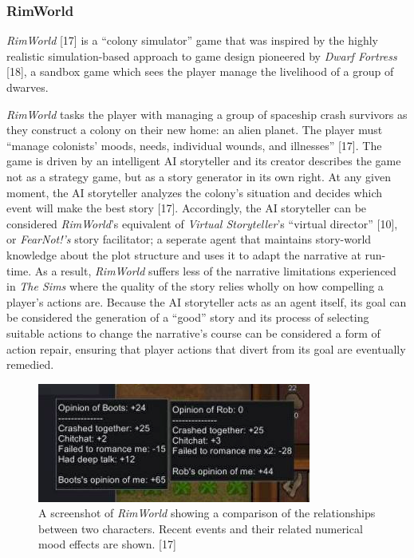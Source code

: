 \documentclass{sig-alternate-05-2015}
\begin{document}
\subsubsection{RimWorld}
\textit{RimWorld} [17] is a ``colony simulator'' game that was inspired by the highly realistic simulation-based approach to game design pioneered by \textit{Dwarf Fortress} [18], a sandbox game which sees the player manage the livelihood of a group of dwarves.

\textit{RimWorld} tasks the player with managing a group of spaceship crash survivors as they construct a colony on their new home: an alien planet. The player must ``manage colonists' moods, needs, individual wounds, and illnesses'' [17]. The game is driven by an intelligent AI storyteller and its creator describes the game not as a strategy game, but as a story generator in its own right. At any given moment, the AI storyteller analyzes the colony's situation and decides which event will make the best story [17]. Accordingly, the AI storyteller can be considered \textit{RimWorld}'s equivalent of \textit{Virtual Storyteller}'s ``virtual director'' [10], or \textit{FearNot!'s} story facilitator;  a seperate agent that maintains story-world knowledge about the plot structure and uses it to adapt the narrative at run-time. As a result, \textit{RimWorld} suffers less of the narrative limitations experienced in \textit{The Sims} where the quality of the story relies wholly on how compelling a player's actions are. Because the AI storyteller acts as an agent itself, its goal can be considered the generation of a ``good'' story and its process of selecting suitable actions to change the narrative's course can be considered a form of action repair, ensuring that player actions that divert from its goal are eventually remedied. 

\begin{figure}
\centering
\includegraphics[scale=0.68]{Images/rimworld.png}
\caption{A screenshot of \textit{RimWorld} showing a comparison of the relationships between two characters. Recent events and their related numerical mood effects are shown. [17]}
\end{figure}
\end{document}
